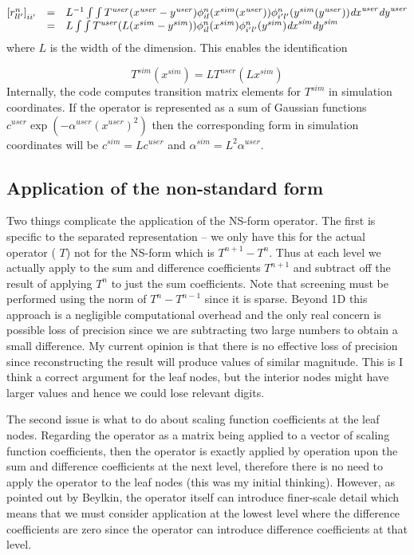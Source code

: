 \documentclass[letterpaper]{book}
\begin{document}
\begin{equation}
\begin{matrix}\left[r_{ll'}^{n}\right]_{ii'}&=&L^{-1}\int {\int
{T^{\mathit{user}}(x^{\mathit{user}}-y^{\mathit{user}})\phi _{il}^{n}(x^{sim}(x^{\mathit{user}}))\phi
_{i'l'}^{n}(y^{sim}(y^{\mathit{user}}))\mathit{dx}^{\mathit{user}}}\mathit{dy}^{\mathit{user}}}\\&=&L\int {\int
{T^{\mathit{user}}(L(x^{sim}-y^{sim}))\phi _{il}^{n}(x^{sim})\phi
_{i'l'}^{n}(y^{sim})\mathit{dx}^{\mathit{sim}}}\mathit{dy}^{\mathit{sim}}}\hfill\null \end{matrix}
\end{equation}
where  $L$ is the width of the dimension. This enables the identification 

\begin{equation}
T^{sim}(x^{sim})=LT^{\mathit{user}}(Lx^{sim})
\end{equation}
Internally, the code computes transition matrix elements for  $T^{sim}$ in simulation coordinates. If the operator is
represented as a sum of Gaussian functions  $c^{\mathit{user}}\exp (-\alpha ^{\mathit{user}}(x^{\mathit{user}})^{2})$
then the corresponding form in simulation coordinates will be  $c^{sim}=Lc^{\mathit{user}}$ and  $\alpha
^{\mathit{sim}}=L^{2}\alpha ^{\mathit{user}}$.

\subsection{Application of the non-standard form}
Two things complicate the application of the NS-form operator. The first is specific to the separated representation --
we only have this for the actual operator ( $T$) not for the NS-form which is  $T^{n+1}-T^{n}$. Thus at each level we
actually apply to the sum and difference coefficients  $T^{n+1}$ and subtract off the result of applying  $T^{n}$ to
just the sum coefficients. Note that screening must be performed using the norm of  $T^{n}-T^{n-1}$ since it is sparse.
Beyond 1D this approach is a negligible computational overhead and the only real concern is possible loss of precision
since we are subtracting two large numbers to obtain a small difference. My current opinion is that there is no
effective loss of precision since reconstructing the result will produce values of similar magnitude. This is I think a
correct argument for the leaf nodes, but the interior nodes might have larger values and hence we could lose relevant
digits.

The second issue is what to do about scaling function coefficients at the leaf nodes. Regarding the operator as a matrix
being applied to a vector of scaling function coefficients, then the operator is exactly applied by operation upon the
sum and difference coefficients at the next level, therefore there is no need to apply the operator to the leaf nodes
(this was my initial thinking). However, as pointed out by Beylkin, the operator itself can introduce finer-scale
detail which means that we must consider application at the lowest level where the difference coefficients are zero
since the operator can introduce difference coefficients at that level.
\end{document}
